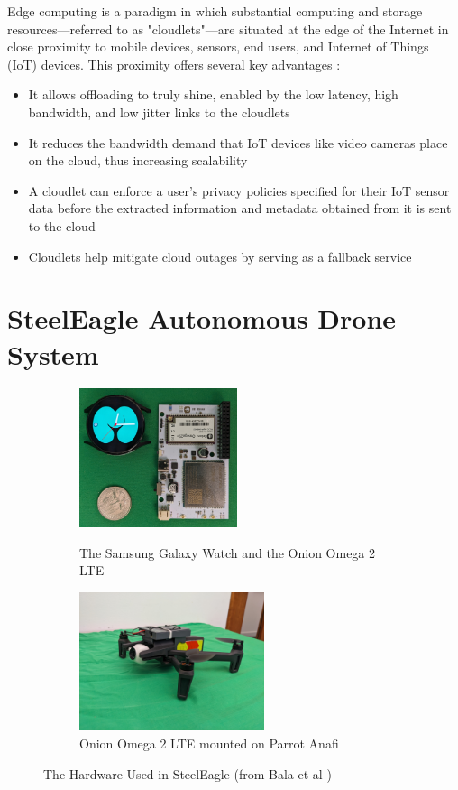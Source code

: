 Edge computing is a paradigm in which substantial computing and storage
resources---referred to as "cloudlets"---are situated at the edge of the
Internet in close proximity to mobile devices, sensors, end users, and Internet
of Things (IoT) devices. This proximity offers several key advantages \cite{satya2017}:
\begin{itemize}
    \item It allows offloading to truly shine, enabled by the low latency, high
bandwidth, and low jitter links to the cloudlets
    \item It reduces the bandwidth demand that IoT devices like video cameras place on the cloud, thus increasing scalability \cite{premsankar2018}
    \item A cloudlet can enforce a user's privacy policies specified for their IoT sensor data before the extracted information and metadata obtained from it is sent to the cloud
    \item Cloudlets help mitigate cloud outages by serving as a fallback service
\end{itemize}

\section{SteelEagle Autonomous Drone System}
\label{sec:steeleagle-bg}

\begin{figure}[htbp]
\centering
\begin{subfigure}[t]{0.3\textwidth}
\centering
\includegraphics[height=1.6in]{sec2023-figs/fig-omega-internals.jpg}\\
\caption{The Samsung Galaxy Watch and the Onion Omega 2 LTE}
\end{subfigure}
\hspace{3em}
\begin{subfigure}[t]{0.3\textwidth}
\centering
\includegraphics[height=1.6in]{sec2023-figs/fig-omega-harness.jpg}
\caption{Onion Omega 2 LTE mounted on Parrot Anafi}
\end{subfigure}
\caption{The Hardware Used in SteelEagle (from Bala et al \cite{bala2024})}
\label{fig:galaxy_watch}
\end{figure}

